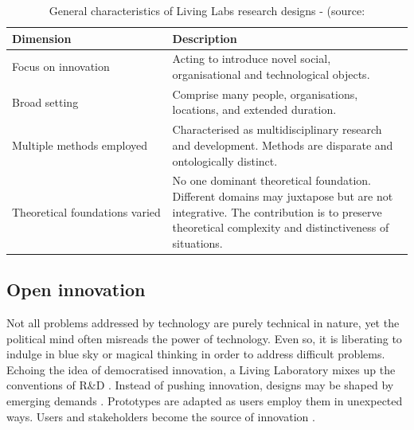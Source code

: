 \documentclass[graybox]{styles/svmult}
\begin{document}
\begin{table}[]
\centering
\caption{General characteristics of Living Labs research designs - (source:\cite[p. 129]{AcceleratingGlobalSupplyChains_ch14}}
\label{tab:LL}
\begin{tabular}{|p{0.4\linewidth}|p{0.6\linewidth}|}
\hline
Dimension            & Description                                                                                                                                                                                \\ \hline
Focus on innovation            & Acting to introduce novel social, organisational and technological objects.                                                                                                                \\ \hline
Broad setting                  & Comprise many people, organisations, locations, and extended duration.                                                                                                                     \\ \hline
Multiple methods employed      & Characterised as multidisciplinary research and development. Methods are disparate and ontologically distinct.                                                                             \\ \hline
Theoretical foundations varied & No one dominant theoretical foundation. Different domains may juxtapose but are not integrative. The contribution is to preserve theoretical complexity and distinctiveness of situations. \\ \hline
\end{tabular}
\end{table}



\subsection{Open innovation}
Not all problems addressed by technology are purely technical in nature, yet the political mind often misreads the power of technology. 
Even so, it is liberating to indulge in blue sky or magical thinking in order to address difficult problems. 
Echoing the idea of democratised innovation, a Living Laboratory mixes up the conventions of R\&D \citep{Hip2005aa}. Instead of pushing innovation, designs may be shaped by emerging demands \citep{pierson2005configuring}. Prototypes are adapted as users employ them in unexpected ways. Users and stakeholders become the source of innovation \citep{eriksson2006living,pierson2005configuring,henriksen2008pacta}.
\end{document}
